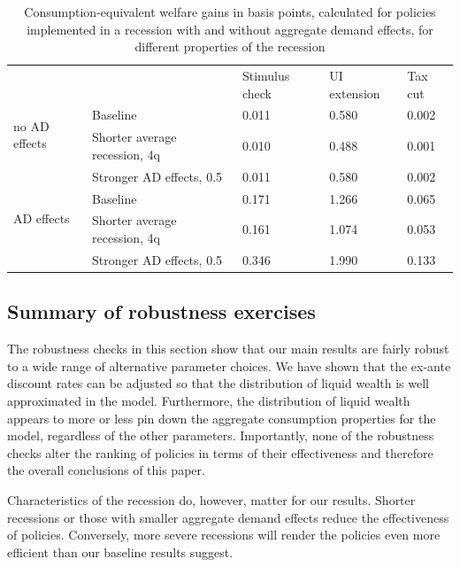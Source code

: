 \documentclass[\econtexRoot/HAFiscal]{subfiles}
\begin{document}
\begin{table}[]
  \begin{center}
    \begin{tabular}{@{}lllll@{}}
      \toprule
      &                    											& Stimulus check & UI extension & Tax cut 	\\ \cmidrule(l){1-5}
      \multirow{2}{*}{no AD effects} 					& Baseline 						& 0.011          & 0.580        & 0.002   	\\ 
      & Shorter average recession, 4q & 0.010          & 0.488        & 0.001  	\\
      & Stronger AD effects, 0.5 		& 0.011          & 0.580        & 0.002   	\\ \cmidrule(l){1-5}
      \multirow{2}{*}{AD effects}						& Baseline    					& 0.171          & 1.266        & 0.065   	\\
      & Shorter average recession, 4q & 0.161          & 1.074        & 0.053   	\\
      & Stronger AD effects, 0.5    	& 0.346          & 1.990        & 0.133   	\\ \cmidrule(l){1-5} 
    \end{tabular}
    \caption{Consumption-equivalent welfare gains in basis points, calculated for policies implemented in a recession with and without aggregate demand effects, for different properties of the recession}
    \notinsubfile{\label{tab:robustness_recession_property_results}}
  \end{center}
\end{table}




\FloatBarrier
\subsection{Summary of robustness exercises}
\notinsubfile{\label{sec:robust_summary}}

The robustness checks in this section show that our main results are fairly robust to a wide range of alternative parameter choices. We have shown that the ex-ante discount rates can be adjusted so that the distribution of liquid wealth is well approximated in the model. Furthermore, the distribution of liquid wealth appears to more or less pin down the aggregate consumption properties for the model, regardless of the other parameters. Importantly, none of the robustness checks alter the ranking of policies in terms of their effectiveness and therefore the overall conclusions of this paper.

Characteristics of the recession do, however, matter for our results. Shorter recessions or those with smaller aggregate demand effects reduce the effectiveness of policies. Conversely, more severe recessions will render the policies even more efficient than our baseline results suggest.
\end{document}
